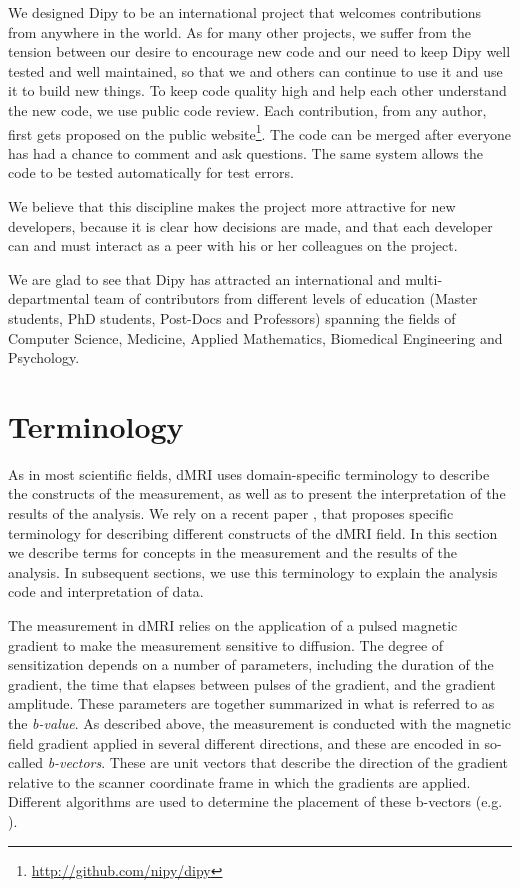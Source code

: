 \documentclass{bioinfo}
\begin{document}
We designed Dipy to be an international project that welcomes contributions from
anywhere in the world. As for many other projects, we suffer from the tension
between our desire to encourage new code and our need to keep Dipy well tested
and well maintained, so that we and others can continue to use it and use it to
build new things. To keep code quality high and help each other understand the
new code, we use public code review.  Each contribution, from any author, first
gets proposed on the public website\footnote{\url{http://github.com/nipy/dipy}}. The code can
be merged after everyone has had a chance to comment and ask questions.  The
same system allows the code to be tested automatically for test errors.

We believe that this discipline makes the project more attractive for new
developers, because it is clear how decisions are made, and that each developer
can and must interact as a peer with his or her colleagues on the project.

We are glad to see that Dipy has attracted an international and
multi-departmental team of contributors from different levels of education
(Master students, PhD students, Post-Docs and Professors) spanning the fields of
Computer Science, Medicine, Applied Mathematics, Biomedical Engineering and
Psychology.


\section{Terminology}

As in most scientific fields, dMRI uses domain-specific
terminology to describe the constructs of the measurement, as well as to
present the interpretation of the results of the analysis. We rely on a recent
paper \citep{Cote2013tractometer}, that proposes specific terminology for
describing different constructs of the dMRI field. In this section we
describe terms for concepts in the measurement and the results of the analysis.
In subsequent sections, we use this terminology to explain the analysis code and
interpretation of data.

The measurement in dMRI relies on the application of a pulsed magnetic gradient
to make the measurement sensitive to diffusion. The degree of sensitization
depends on a number of parameters, including the duration of the
gradient, the time that elapses between pulses of the gradient, and the gradient
amplitude. These parameters are together summarized in what is referred to as
the \emph{b-value}.  As described above, the measurement is conducted with the
magnetic field gradient applied in several different directions, and these are
encoded in so-called \emph{b-vectors}. These are unit vectors that describe
the direction of the gradient relative to the scanner coordinate frame in which
the gradients are applied. Different algorithms are used to determine the
placement of these b-vectors (e.g. \citep{jones-etal:99, Caruyer2013}).
\end{document}
